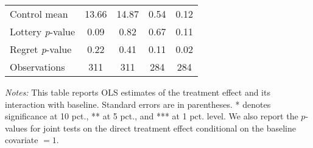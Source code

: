 \begin{table}[ht]
{\begin{threeparttable}
\begin{tabular}{l*{4}{c}}
Control mean    &    13.66         &    14.87         &     0.54         &     0.12         \\
Lottery \emph{p}-value&     0.09         &     0.82         &     0.67         &     0.11         \\
Regret \emph{p}-value&     0.22         &     0.41         &     0.11         &     0.02         \\
Observations    &      311         &      311         &      284         &      284         \\
\bottomrule \end{tabular} \begin{tablenotes}[flushleft] \footnotesize \item \emph{Notes:} This table reports OLS estimates of the treatment effect and its interaction with baseline. Standard errors are in parentheses. * denotes significance at 10 pct., ** at 5 pct., and *** at 1 pct. level. We also report the \(p\)-values for joint tests on the direct treatment effect conditional on the baseline covariate $= 1$. \end{tablenotes} \end{threeparttable} } \end{table}

